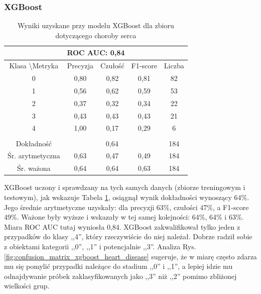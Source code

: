 \subsubsection{XGBoost}
\begin{table}[H]
    \centering
    \caption{Wyniki uzyskane przy modelu XGBoost dla zbioru dotyczącego choroby serca}
\begin{tabular}{|ccccc|}
\hline
\multicolumn{5}{|c|}{ROC AUC: 0,84}  \\ \hline
\multicolumn{1}{|c|}{Klasa \textbackslash Metryka} & \multicolumn{1}{c|}{Precyzja} & \multicolumn{1}{c|}{Czułość} & \multicolumn{1}{c|}{F1-score} & Liczba \\ \hline
\multicolumn{1}{|c|}{0}                            & \multicolumn{1}{c|}{0,80}     & \multicolumn{1}{c|}{0,82}    & \multicolumn{1}{c|}{0,81}     & 82    \\ \hline
\multicolumn{1}{|c|}{1}                            & \multicolumn{1}{c|}{0,56}     & \multicolumn{1}{c|}{0,62}    & \multicolumn{1}{c|}{0,59}     & 53    \\ \hline
\multicolumn{1}{|c|}{2}                            & \multicolumn{1}{c|}{0,37}     & \multicolumn{1}{c|}{0,32}    & \multicolumn{1}{c|}{0,34}     & 22    \\ \hline
\multicolumn{1}{|c|}{3}                            & \multicolumn{1}{c|}{0,43}     & \multicolumn{1}{c|}{0,43}    & \multicolumn{1}{c|}{0,43}     & 21    \\ \hline
\multicolumn{1}{|c|}{4}                            & \multicolumn{1}{c|}{1,00}     & \multicolumn{1}{c|}{0,17}    & \multicolumn{1}{c|}{0,29}     & 6     \\ \hline
\multicolumn{5}{|c|}{} \\ \hline
\multicolumn{1}{|c|}{Dokładność} & \multicolumn{3}{c|}{0,64}  & 184   \\ \hline
\multicolumn{1}{|c|}{Śr. arytmetyczna}  & \multicolumn{1}{c|}{0,63}     & \multicolumn{1}{c|}{0,47}    & \multicolumn{1}{c|}{0,49}     & 184   \\ \hline
\multicolumn{1}{|c|}{Śr. ważona}                   & \multicolumn{1}{c|}{0,64}     & \multicolumn{1}{c|}{0,64}    & \multicolumn{1}{c|}{0,63}     & 184   \\ \hline
\end{tabular}
    \label{tab:heart_disease_xgboost_metrics}
\end{table}

XGBoost uczony i sprawdzany na tych samych danych (zbiorze treningowym i testowym), jak wskazuje Tabela \ref{tab:heart_disease_xgboost_metrics}, osiągnął wynik dokładności wynoszący 64\%. Jego średnie arytmetyczne uzyskały: dla precyzji 63\%, czułości 47\%, a F1-score 49\%. Ważone były wyższe i wskazały w tej samej kolejności: 64\%, 64\% i 63\%. Miara ROC AUC tutaj wyniosła 0,84. XGBoost zakwalifikował tylko jeden z przypadków do klasy ,,4'', który rzeczywiście do niej należał. Dobrze radził sobie z obiektami kategorii ,,0'', ,,1'' i potencjalnie ,,3''. Analiza Rys. \ref{fig:confusion_matrix_xgboost_heart_disease} sugeruje, że w miarę często zdarza mu się pomylić przypadki należące do stadium ,,0'' i ,,1'', a lepiej idzie mu odnajdywanie próbek zaklasyfikowanych jako ,,3'' niż ,,2'' pomimo zbliżonej wielkości grup.

